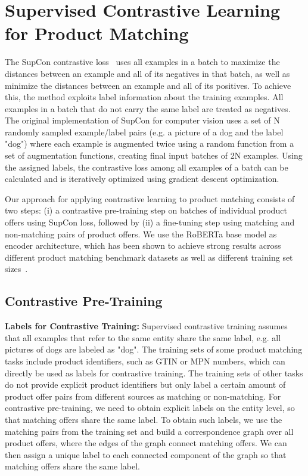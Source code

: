 \documentclass[sigconf]{acmart}
\begin{document}
\section{Supervised Contrastive Learning for Product Matching}
\label{sec:supcon}

The SupCon contrastive loss~\cite{khoslaSupervisedContrastiveLearning2021} uses all examples in a batch to maximize the distances between an example and all of its negatives in that batch, as well as minimize the distances between an example and all of its positives. To achieve this, the method exploits label information about the training examples. All examples in a batch that do not carry the same label are treated as negatives. The original implementation of SupCon for computer vision uses a set of N randomly sampled example/label pairs (e.g. a picture of a dog and the label "dog") where each example is augmented twice using a random function from a set of augmentation functions, creating final input batches of 2N examples. Using the assigned labels, the contrastive loss among all examples of a batch can be calculated and is iteratively optimized using gradient descent optimization. 







Our approach for applying contrastive learning to product matching consists of two steps: (i) a contrastive pre-training step on batches of individual product offers using SupCon loss, followed by (ii) a fine-tuning step using matching and non-matching pairs of product offers. We use the RoBERTa base model as encoder architecture, which has been shown to achieve strong results across different product matching benchmark datasets as well as different training set sizes~\cite{peetersDualobjectiveFinetuningBERT2021}.

\subsection{Contrastive Pre-Training}
\label{subsec:contrastivestep}


\textbf{Labels for Contrastive Training:} Supervised contrastive training assumes that all examples that refer to the same entity share the same label, e.g. all pictures of dogs are labeled as "dog". The training sets of some product matching tasks include product identifiers, such as GTIN or MPN numbers, which can directly be used as labels for contrastive training. The training sets of other tasks do not provide explicit product identifiers but only label a certain amount of product offer pairs from different sources as matching or non-matching. For contrastive pre-training, we need to obtain explicit labels on the entity level, so that matching offers share the same label. To obtain such labels, we use the matching pairs from the training set and build a correspondence graph over all product offers, where the edges of the graph connect matching offers. We can then assign a unique label to each connected component of the graph so that matching offers share the same label.
\end{document}
